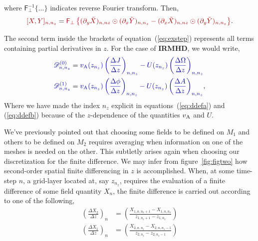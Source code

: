 \documentclass[12pt, letterpaper, oneside, leqno, openright]{memoir}
\newcommand{\irmhd}{\textbf{IRMHD}}
\newcommand{\fftperp}{\mathsf{F}_\perp}
\newcommand{\dfield}{\mathscr{D}}
\begin{document}
%
where $\fftperp^{-1}\{\ldots\}$ indicates reverse Fourier
transform. Then,
%
\begin{equation}
  {\color{red!65!black}[X,Y]_{n,n_z}} = {\color{red!65!black}{\fftperp}
   \left\{   
             (\pardy \tilde X)_{n,nz} \odot (\pardx \tilde Y)_{n,n_z}
           - (\pardx \tilde X)_{n,nz} \odot (\pardy \tilde Y)_{n,n_z} 
  \right\}}.
\end{equation}
%
\par
%
The second term inside the brackets of equation~(\ref{eq:exstep})
represents all terms containing partial derivatives in $z$. For the
case of \irmhd, we would write,
%
\begin{subequations}
\begin{align}
%
  {\color{blue!65!black}\dfield^{(0)}_{n,n_z}} &= 
%
  {\color{blue!65!black}
     \magvalfven(z_{n_z})\left(\frac{\Delta  J}{\Delta z}\right)_{n,n_z} 
    - U(z_{n_z})\left(\frac{\Delta \Omega}{\Delta z}\right)_{n,n_z}
  } \label{eq:ddefa} \\
%
  {\color{blue!65!black}\dfield^{(1)}_{n,n_z}} &= 
%
  {\color{blue!65!black}
    \magvalfven(z_{n_z})\left(\frac{\Delta \phi}{\Delta z}\right)_{n,n_z}
   - U(z_{n_z})\left(\frac{\Delta A}{\Delta z}\right)_{n,n_z}
  },\label{eq:ddefb}
%
\end{align}
\end{subequations}
%
Where we have made the index $n_z$ explicit in equations~(\ref{eq:ddefa})
and (\ref{eq:ddefb}) because of the $z$-dependence of the quantities
$v_{\mathrm{A}}$ and $U$.
%
\par
%
We've previously pointed out that choosing some fields to be defined on
$M_1$ and others to be defined on $M_2$ requires averaging when information
on one of the meshes is needed on the other. This subtletly arises again
when choosing our discretization for the finite difference. We may infer
from figure~\ref{fig:figtwo} how second-order spatial finite differencing
in $z$ is accomplished. When, at some time-step $n$, a grid-layer located
at, say $z_{n_z}$, requires the evaluation of a finite difference of some
field quantity $X_n$, the finite difference is carried out according to
one of the following,
%
\begin{subequations}
\begin{eqnarray}
  \left(\frac{\Delta X_2}{\Delta z}\right)_n &= \left(\frac{X_{1,n,n_z+1} - X_{1,n,n_z  }}{z_{1,n_z+1}-z_{1,n_z  }}\right) 
  \label{eq:fda} \\
  \left(\frac{\Delta X_1}{\Delta z}\right)_n &= \left(\frac{X_{2,n,n_z}   - X_{2,n,n_z-1}}{z_{2,n_z}  -z_{2,n_z-1}}\right)
  \label{eq:fdb}
\end{eqnarray}
\end{subequations}
\end{document}
